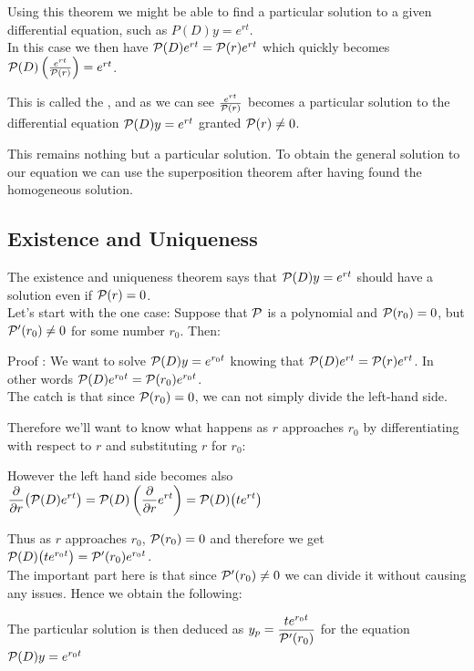 \documentclass[11pt, openright]{book}
\begin{document}
Using this theorem we might be able to find a particular solution to a given differential equation, such as $P(D)y=e^{rt}$.\\
In this case we then have $\P(D)e^{rt}=\P(r)e^{rt}$ which quickly becomes $\P(D)\lr{\frac{e^{rt}}{\P(r)}}=e^{rt}$.

This is called the , and as we can see $\frac{e^{rt}}{\P(r)}$ becomes a particular solution to the differential equation $\P(D)y=e^{rt}$ granted $\P(r)\neq 0$.

This remains nothing but a particular solution. To obtain the general solution to our equation we can use the superposition theorem after having found the homogeneous solution.

\subsection{Existence and Uniqueness}

The existence and uniqueness theorem says that $\P(D)y=e^{rt}$ should have a solution even if $\P(r)=0$.\\
Let's start with the one case: Suppose that $\P$ is a polynomial and $\P(r_0)=0$, but $\P'(r_0)\neq 0$ for some number $r_0$. Then:

\begin{dent}{Proof :}
    We want to solve $\P(D)y=e^{r_0t}$ knowing that $\P(D)e^{rt}=\P(r)e^{rt}$. In other words $\P(D)e^{r_0t}=\P(r_0)e^{r_0t}$.\\
    The catch is that since $\P(r_0)=0$, we can not simply divide the left-hand side.

    Therefore we'll want to know what happens as $r$ approaches $r_0$ by differentiating with respect to $r$ and substituting $r$ for $r_0$:

    However the left hand side becomes also $\ds{\frac{\vard}{\vard r}\big(\P(D)e^{rt}\big)=\P(D)\lr{\frac{\vard}{\vard r}e^{rt}}=\P(D)\big(te^{rt}\big)}$

    Thus as $r$ approaches $r_0$, $\P(r_0)=0$ and therefore we get $\P(D)\big(te^{r_0t}\big)=\P'(r_0)e^{r_0t}$.\\
    The important part here is that since $\P'(r_0)\neq 0$ we can divide it without causing any issues. Hence we obtain the following:

    The particular solution is then deduced as $\ds{y_p=\frac{te^{r_0t}}{\P'(r_0)}}$ for the equation $\P(D)y=e^{r_0t}$
\end{dent}
\end{document}
